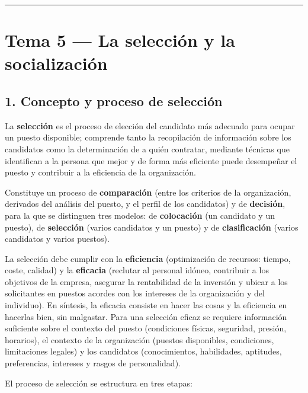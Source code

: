 \documentclass[12pt]{book} %
\begin{document}
\begin{center}\rule{0.5\linewidth}{0.5pt}\end{center}

\hypertarget{tema-5-la-selecciuxf3n-y-la-socializaciuxf3n}{%
\chapter{Tema 5 --- La selección y la
socialización}\label{tema-5-la-selecciuxf3n-y-la-socializaciuxf3n}}

\hypertarget{concepto-y-proceso-de-selecciuxf3n}{%
\section{1. Concepto y proceso de
selección}\label{concepto-y-proceso-de-selecciuxf3n}}

La \textbf{selección} es el proceso de elección del candidato más
adecuado para ocupar un puesto disponible; comprende tanto la
recopilación de información sobre los candidatos como la determinación
de a quién contratar, mediante técnicas que identifican a la persona que
mejor y de forma más eficiente puede desempeñar el puesto y contribuir a
la eficiencia de la organización.

Constituye un proceso de \textbf{comparación} (entre los criterios de la
organización, derivados del análisis del puesto, y el perfil de los
candidatos) y de \textbf{decisión}, para la que se distinguen tres
modelos: de \textbf{colocación} (un candidato y un puesto), de
\textbf{selección} (varios candidatos y un puesto) y de
\textbf{clasificación} (varios candidatos y varios puestos).

La selección debe cumplir con la \textbf{eficiencia} (optimización de
recursos: tiempo, coste, calidad) y la \textbf{eficacia} (reclutar al
personal idóneo, contribuir a los objetivos de la empresa, asegurar la
rentabilidad de la inversión y ubicar a los solicitantes en puestos
acordes con los intereses de la organización y del individuo). En
síntesis, la eficacia consiste en hacer las cosas y la eficiencia en
hacerlas bien, sin malgastar. Para una selección eficaz se requiere
información suficiente sobre el contexto del puesto (condiciones
físicas, seguridad, presión, horarios), el contexto de la organización
(puestos disponibles, condiciones, limitaciones legales) y los
candidatos (conocimientos, habilidades, aptitudes, preferencias,
intereses y rasgos de personalidad).

El proceso de selección se estructura en tres etapas:
\end{document}
